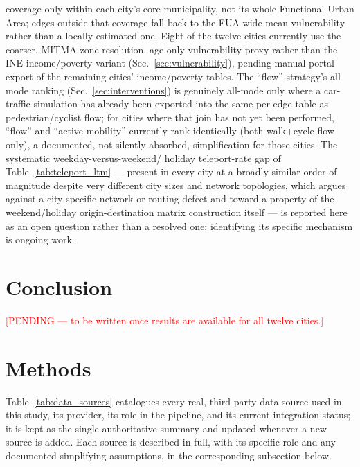 \documentclass[pdflatex,sn-mathphys-ay]{sn-jnl}
\begin{document}
coverage only within each city's core municipality, not its whole Functional
Urban Area; edges outside that coverage fall back to the FUA-wide mean
vulnerability rather than a locally estimated one. Eight of the twelve
cities currently use the coarser, MITMA-zone-resolution, age-only
vulnerability proxy rather than the INE income/poverty variant
(Sec.~\ref{sec:vulnerability}), pending manual portal export of the
remaining cities' income/poverty tables. The ``flow'' strategy's all-mode
ranking (Sec.~\ref{sec:interventions}) is genuinely all-mode only where a
car-traffic simulation has already been exported into the same per-edge
table as pedestrian/cyclist flow; for cities where that join has not yet
been performed, ``flow'' and ``active-mobility'' currently rank identically
(both walk+cycle flow only), a documented, not silently absorbed,
simplification for those cities. The systematic weekday-versus-weekend/
holiday teleport-rate gap of Table~\ref{tab:teleport_ltm} --- present in
every city at a broadly similar order of magnitude despite very different
city sizes and network topologies, which argues against a
city-specific network or routing defect and toward a property of the
weekend/holiday origin-destination matrix construction itself --- is
reported here as an open question rather than a resolved one; identifying
its specific mechanism is ongoing work.

\section{Conclusion}
\label{sec:conclusion}

\textcolor{red}{[PENDING --- to be written once results are available for all
twelve cities.]}

\section{Methods}
\label{sec:methods}

Table~\ref{tab:data_sources} catalogues every real, third-party data source
used in this study, its provider, its role in the pipeline, and its current
integration status; it is kept as the single authoritative summary and
updated whenever a new source is added. Each source is described in full,
with its specific role and any documented simplifying assumptions, in the
corresponding subsection below.
\end{document}
